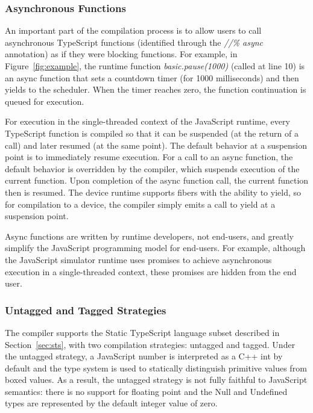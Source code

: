 {\subsubsection{Asynchronous Functions}

An important part of the compilation process is to allow users to call asynchronous 
TypeScript functions (identified through the \emph{//\% async} annotation) 
as if they were blocking functions.  For example, in Figure~\ref{fig:example}, the runtime 
function \emph{basic.pause(1000)} (called at line 10) 
is an async function that sets a countdown timer (for 1000 milliseconds) 
and then yields to the scheduler. When the timer 
reaches zero, the function continuation is queued for execution. 

For execution in the single-threaded context of the JavaScript runtime,
every TypeScript function is compiled so that it can be suspended (at the return of a call) and later resumed (at the same point). 
The default behavior at a suspension point is to immediately resume execution.  For a call to an async function,
the default behavior is overridden by the compiler, which suspends execution of the current function. 
Upon completion of the async function call, the current function then is resumed. 
The \CO device runtime supports fibers with the ability to yield, so for compilation to a device, 
the compiler simply emits a call to yield at a suspension point.

Async functions are written by runtime developers, not end-users, and greatly simplify the JavaScript
programming model for end-users. For example, although the JavaScript simulator runtime uses promises to 
achieve asynchronous execution in a single-threaded context, these promises are hidden from the end user. 

\subsubsection{Untagged and Tagged Strategies}

The \MC compiler supports the Static TypeScript language subset described in Section~\ref{sec:sts},
with two compilation strategies: untagged and tagged. Under the untagged strategy,
a JavaScript number is interpreted as a C++ int by default and the type system is used
to statically distinguish primitive values from boxed values. As a result, the untagged
strategy is not fully faithful to JavaScript semantics: there is no support for floating
point and the Null and Undefined types are represented by the default integer value of zero.

}
